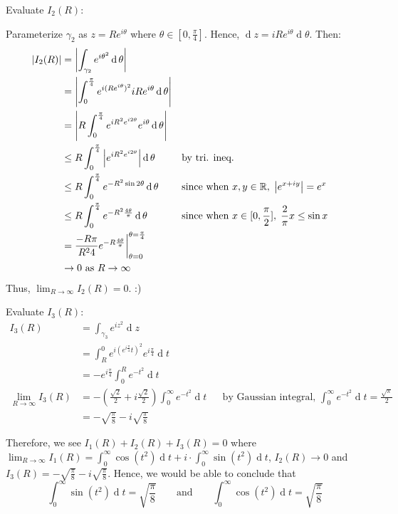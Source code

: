 \documentclass[12pt]{article}
\renewcommand{\d}{\ensuremath{\operatorname{d}}}
\begin{document}
Evaluate $I_2(R)$:

Parameterize $\gamma_2$ as $z=Re^{i\theta}$ where $\theta\in[0,\frac{\pi}{4}]$. Hence, $\d z = iRe^{i\theta}\d \theta$. Then:
\begin{align*}
    |I_2(R)| &= \left|\int_{\gamma_2} e^{i\theta^2}\d \theta\right|\\
    &= \left|\int_{0}^{\frac{\pi}{4}}e^{i(R e^{i\theta})^2}iRe^{i\theta}\d \theta\right|\\
    &= \left|R\int_{0}^{\frac{\pi}{4}}e^{iR^2e^{i2\theta}}e^{i\theta}\d \theta\right|\\
    &\leq R\int_{0}^{\frac{\pi}{4}}\left|e^{iR^2e^{i2\theta}}\right|\d \theta &&\text{by tri. ineq.}\\
    &\leq R\int_{0}^{\frac{\pi}{4}}e^{-R^2\sin2\theta}\d \theta&&\text{since when }x,y\in \R,\; \left|e^{x+iy}\right|=e^{x}\\
    &\leq  R\int_{0}^{\frac{\pi}{4}} e^{-R^2\frac{4\theta}{\pi}}\d \theta &&\text{since when }x\in [0,\frac{\pi}{2}],\; \frac{2}{\pi}x\leq \sin x\\
    &= \frac{-R\pi}{R^2 4}e^{-R\frac{4\theta}{\pi}}\bigg |_{\theta=0}^{\theta=\frac{\pi}{4}}\\
    &\to 0 \text{ as }R\to \infty
\end{align*}
Thus, $\lim_{R\to \infty}I_2(R)=0$. :)

Evaluate $I_3(R)$:
\begin{align*}
    I_3(R) &=\int_{\gamma_3} e^{iz^2}\d z\\
    &= \int_{R}^{0}e^{i(e^{i\frac{\pi}{4}}t)^2}e^{i\frac{\pi}{4}}\d t\\
    &= -e^{i\frac{\pi}{4}} \int_{0}^{R}e^{-t^2}\d t\\
    \lim_{R\to \infty} I_3(R) &= -(\frac{\sqrt{2}}{2}+i\frac{\sqrt{2}}{2})\int_{0}^{\infty}e^{-t^2}\d t &&\text{by Gaussian integral, }\int_{0}^{\infty}e^{-t^2}\d t = \frac{\sqrt{\pi}}{2}\\
    &= -\sqrt{\frac{\pi}{8}}-i\sqrt{\frac{\pi}{8}}
\end{align*}

Therefore, we see $I_1(R)+I_2(R)+I_3(R)=0$ where $\lim_{R\to \infty}I_1(R)= \int_{0}^{\infty}\cos (t^2)\d t + i\cdot \int_{0}^{\infty}\sin (t^2)\d t$, $I_2(R)\to 0$ and $I_3(R)= -\sqrt{\frac{\pi}{8}}-i\sqrt{\frac{\pi}{8}}$. Hence, we would be able to conclude that \[\int_{0}^{\infty}\sin (t^2)\d t = \sqrt{\frac{\pi}{8}} \qquad \text{and} \qquad \int_{0}^{\infty}\cos (t^2)\d t = \sqrt{\frac{\pi}{8}}\]
\end{document}
